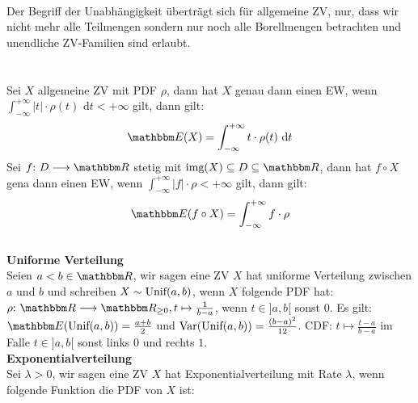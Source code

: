 \textsc{}\\
    Der Begriff der Unabhängigkeit überträgt sich für allgemeine ZV, nur, dass wir nicht mehr alle Teilmengen sondern nur noch alle Borellmengen betrachten und unendliche ZV-Familien sind erlaubt. \\ \\
\textsc{}\\
    Sei \(X\) allgemeine ZV mit PDF \(\rho\), dann hat \(X\) genau dann einen EW, wenn \(\int_{-\infty}^{+\infty}|t| {\cdot} \rho(t) \text{ d}t < +\infty\) gilt, dann gilt:
    \[\Ew(X) = \int_{-\infty}^{+\infty}t \cdot \rho(t)\text{ d}t\]
    Sei \(f\QDp D \longrightarrow \R\) stetig mit \(\img(X) \subseteq D \subseteq \R\), dann hat \(f \circ X\) gena dann einen EW, wenn \(\int_{-\infty}^{+\infty}|f| {\cdot} \rho < +\infty\) gilt, dann gilt:
    \[\Ew(f \circ X) = \int_{-\infty}^{+\infty}f \cdot \rho\]
\textsc{} \\
    \textbf{Uniforme Verteilung}\\
    Seien \(a < b \in \R\), wir sagen eine ZV \(X\) hat uniforme Verteilung zwischen \(a\) und \(b\) und schreiben \(X \sim \text{Unif}(a,b)\), wenn \(X\) folgende PDF hat:
    \(\rho \QDp \R \longrightarrow \R_{\ge 0}, t \mapsto \frac{1}{b-a}\), wenn \(t \in ]a,b[\) sonst \(0\). Es gilt: \(\Ew(\Unif(a,b)) = \frac{a+b}{2}\) und \(\text{Var}(\text{Unif}(a,b)) = \frac{(b-a)^2}{12}\). CDF: \(t \mapsto \frac{t-a}{b-a}\) im Falle \(t \in ]a,b[\) sonst links \(0\) und rechts \(1\). \\
    \textbf{Exponentialverteilung}\\
    Sei \(\lambda > 0\), wir sagen eine ZV \(X\) hat Exponentialverteilung mit Rate \(\lambda\), wenn folgende Funktion die PDF von \(X\) ist: \\
